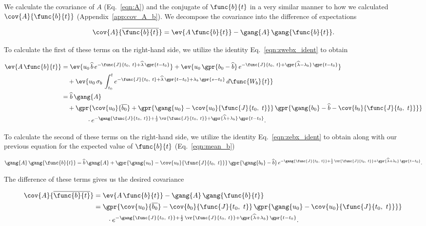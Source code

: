 We calculate the covariance of $A$ (Eq.~\ref{eqn:A}) and the conjugate of $\func{b}{t}$ in a very similar manner to how we calculated $\cov{A}{\func{b}{t}}$ (Appendix~\ref{app:cov_A_b}). We decompose the covariance into the difference of expectations

\begin{equation}
	\cov{A}{\overline{\func{b}{t}}} = \ev{A\,\func{b}{t}} - \gang{A}\,\gang{\func{b}{t}}.
\end{equation}

To calculate the first of these terms on the right-hand side, we utilize the identity Eq.~\ref{eqn:zwebx_ident} to obtain

\begin{align}
	\ev{A\,\func{b}{t}} &= \ev{u_0\,\widehat{b}\,e^{-\func{J}{t_0,\ t} + \widehat{\lambda}\,\gpr{t - t_0}}} + \ev{u_0\,\gpr{b_0 - \widehat{b}}\,e^{-\func{J}{t_0,\ t} + \gpr{\widehat{\lambda} - \lambda_b}\,\gpr{t - t_0}}} \nonumber \\
			&\quad + \ev{u_0\,\sigma_b\,\int_{t_0}^{t} e^{-\func{J}{t_0,\ t} + \widehat{\lambda}\,\gpr{t - t_0} + \lambda_b\,\gpr{s - t_0}}\,d\func{W_b}{t}} \nonumber \\
		&= \widehat{b}\,\gang{A} \nonumber \\
			&\quad + \gpr{\cov{u_0}{\overline{b_0}} + \gpr{\gang{u_0} - \cov{u_0}{\func{J}{t_0,\ t}}}\,\gpr{\gang{b_0} - \widehat{b} - \cov{b_0}{\func{J}{t_0,\ t}}}} \nonumber \\
			&\qquad\qquad \cdot e^{-\gang{\func{J}{t_0,\ t}} + \frac{1}{2}\,\vr{\func{J}{t_0,\ t}} + \gpr{\widehat{\lambda} + \lambda_b}\,\gpr{t - t_0}}.
\end{align}

To calculate the second of these terms on the right-hand side, we utilize the identity Eq.~\ref{eqn:zebx_ident} to obtain along with our previous equation for the expected value of $\func{b}{t}$ (Eq.~\ref{eqn:mean_b})

\begin{equation}
	\gang{A}\,\gang{\func{b}{t}} = \widehat{b}\,\gang{A} + \gpr{\gang{u_0} - \cov{u_0}{\func{J}{t_0,\ t}}}\,\gpr{\gang{b_0} - \widehat{b}}\,e^{-\gang{\func{J}{t_0,\ t}} + \frac{1}{2}\,\vr{\func{J}{t_0,\ t}} + \gpr{\widehat{\lambda} + \lambda_b}\,\gpr{t - t_0}}.
\end{equation}

The difference of these terms gives us the desired covariance

\begin{align}
	\cov{A}{\overline{\func{b}{t}}} &= \ev{A\,\func{b}{t}} - \gang{A}\,\gang{\func{b}{t}} \nonumber \\
		&= \gpr{\cov{u_0}{\overline{b_0}} - \cov{b_0}{\func{J}{t_0,\ t}}\,\gpr{\gang{u_0} - \cov{u_0}{\func{J}{t_0,\ t}}}}\, \nonumber \\
			&\qquad \cdot e^{-\gang{\func{J}{t_0,\ t}} + \frac{1}{2}\,\vr{\func{J}{t_0,\ t}} + \gpr{\widehat{\lambda} + \lambda_b}\,\gpr{t - t_0}}. \label{eqn:cov_A_conjgb}
\end{align}

